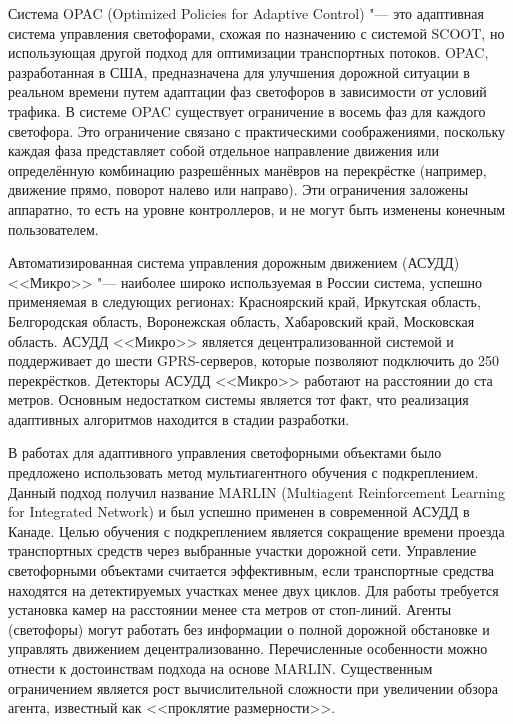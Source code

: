 \documentclass[11pt]{ubs}
\begin{document}
Система OPAC (Optimized Policies for Adaptive Control)\cite{gartner1990} "--- это адаптивная система управления светофорами, схожая по назначению с системой SCOOT, но использующая другой подход для оптимизации транспортных потоков. OPAC, разработанная в США, предназначена для улучшения дорожной ситуации в реальном времени путем адаптации фаз светофоров в зависимости от условий трафика. В системе OPAC существует ограничение в восемь фаз для каждого светофора. Это ограничение связано с практическими соображениями, поскольку каждая фаза представляет собой отдельное направление движения или определённую комбинацию разрешённых манёвров на перекрёстке (например, движение прямо, поворот налево или направо). Эти ограничения заложены аппаратно, то есть на уровне контроллеров, и не могут быть изменены конечным пользователем.

Автоматизированная система управления дорожным движением (АСУДД) <<Микро>> \cite{asudd} "--- наиболее широко используемая в России система, успешно применяемая в следующих регионах:  Красноярский край, Иркутская область, Белгородская область, Воронежская область, Хабаровский край, Московская область. АСУДД <<Микро>> является децентрализованной системой и поддерживает до шести GPRS-серверов, которые позволяют подключить до 250 перекрёстков.  Детекторы АСУДД <<Микро>> работают на расстоянии до ста метров. Основным недостатком системы является тот факт, что реализация адаптивных алгоритмов  находится в стадии разработки.

В работах \cite{el-tantawy2013, tislenko2022a, tislenko2022b} для адаптивного управления светофорными объектами было предложено использовать  метод мультиагентного обучения с подкреплением.  
Данный подход получил название MARLIN (Multiagent Reinforcement Learning for Integrated Network) и  был успешно применен в современной АСУДД в Канаде. Целью обучения с подкреплением является сокращение времени проезда транспортных средств через выбранные участки дорожной сети. Управление светофорными объектами считается эффективным, если транспортные средства находятся на детектируемых участках менее двух циклов.
 Для работы требуется установка камер на расстоянии менее ста метров от стоп-линий. Агенты (светофоры) могут работать без информации о полной дорожной обстановке и управлять движением децентрализованно. Перечисленные особенности можно отнести к достоинствам подхода на основе MARLIN. Существенным ограничением является рост вычислительной сложности при увеличении обзора агента, известный как <<проклятие размерности>>.
\end{document}
